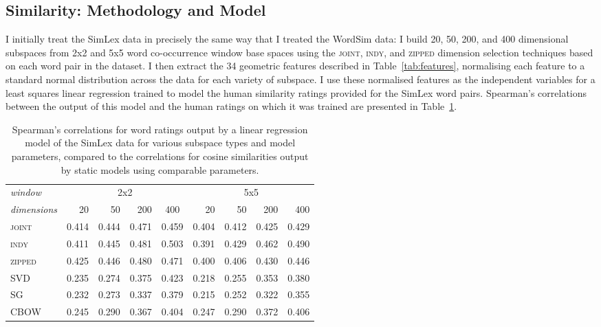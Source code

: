 \subsection{Similarity: Methodology and Model} \label{sec:simmeth}
I initially treat the SimLex data in precisely the same way that I treated the WordSim data: I build 20, 50, 200, and 400 dimensional subspaces from 2x2 and 5x5 word co-occurrence window base spaces using the \textsc{joint}, \textsc{indy}, and \textsc{zipped} dimension selection techniques based on each word pair in the dataset.  I then extract the 34 geometric features described in Table~\ref{tab:features}, normalising each feature to a standard normal distribution across the data for each variety of subspace.  I use these normalised features as the independent variables for a least squares linear regression trained to model the human similarity ratings provided for the SimLex word pairs.  Spearman's correlations between the output of this model and the human ratings on which it was trained are presented in Table~\ref{tab:similar}.

\begin{table}
\centering
\begin{tabular}{lrrrr|rrrr}
\hline
\emph{window} & \multicolumn{4}{c}{2x2} & \multicolumn{4}{c}{5x5} \\
\emph{dimensions} & 20 & 50 & 200 & \multicolumn{1}{c}{400} & 20 & 50 & 200 & 400 \\
\hline
\textsc{joint} & 0.414 & 0.444 & 0.471 & 0.459 & 0.404 & 0.412 & 0.425 & 0.429 \\
\textsc{indy} & 0.411 & 0.445 & 0.481 & 0.503 & 0.391 & 0.429 & 0.462 & 0.490 \\
\textsc{zipped} & 0.425 & 0.446 & 0.480 & 0.471 & 0.400 & 0.406 & 0.430 & 0.446 \\
\textsc{SVD} & 0.235 & 0.274 & 0.375 & 0.423 & 0.218 & 0.255 & 0.353 & 0.380 \\
\textsc{SG} & 0.232 & 0.273 & 0.337 & 0.379 & 0.215 & 0.252 & 0.322 & 0.355 \\
\textsc{CBOW} & 0.245 & 0.290 & 0.367 & 0.404 & 0.247 & 0.290 & 0.372 & 0.406 \\
\hline
\end{tabular}
\caption[Spearman's Correlations for Similarity]{Spearman's correlations for word ratings output by a linear regression model of the SimLex data for various subspace types and model parameters, compared to the correlations for cosine similarities output by static models using comparable parameters.}
\label{tab:similar}
\end{table}

